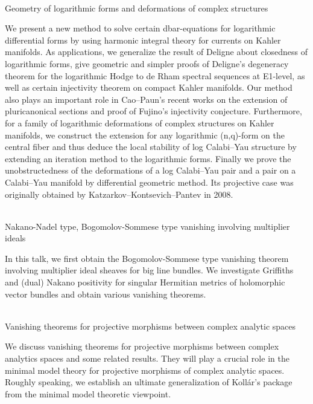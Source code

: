 \documentclass[dvipdfmx,a4paper,12pt]{article}
\theoremstyle{plain} %
\theoremstyle{definition} %
\begin{document}
\\
Geometry of logarithmic forms and deformations of complex structures

\vskip3mm
 We present a new method to solve certain dbar-equations for logarithmic differential forms by using harmonic integral theory for currents on Kahler manifolds. As applications, we generalize the result of Deligne about closedness of logarithmic forms, give geometric and simpler proofs of Deligne's degeneracy theorem for the logarithmic Hodge to de Rham spectral sequences at E1-level, as well as certain injectivity theorem on compact Kahler manifolds. Our method also plays an important role in Cao--Paun's recent works on the extension of pluricanonical sections and proof of Fujino's injectivity conjecture. 
     Furthermore, for a family of logarithmic deformations of complex structures on Kahler manifolds, we construct the extension for any logarithmic (n,q)-form on the central fiber and thus deduce the local stability of log Calabi--Yau structure by extending an iteration method to the logarithmic forms. Finally we prove the unobstructedness of the deformations of a log Calabi--Yau pair and a pair on a Calabi--Yau manifold by differential geometric method. Its projective case was originally obtained by Katzarkov--Kontsevich--Pantev in 2008. 
\vskip6mm

\\
Nakano-Nadel type, Bogomolov-Sommese type vanishing involving multiplier ideals

\vskip3mm
In this talk, we first obtain the Bogomolov-Sommese type vanishing theorem involving multiplier ideal sheaves for big line bundles. We investigate Griffiths and (dual) Nakano positivity for singular Hermitian metrics of holomorphic vector bundles and obtain various vanishing theorems.
\vskip6mm

\newpage 

\vskip3mm

\\
Vanishing theorems for projective morphisms between complex analytic spaces 

\vskip3mm
We discuss vanishing theorems for projective morphisms between complex analytics spaces and some related results. They will play a crucial role in the minimal model theory for projective morphisms of complex analytic spaces. Roughly speaking, we establish an ultimate generalization of Koll\'ar's package from the minimal model theoretic viewpoint.
\vskip6mm
\end{document}
